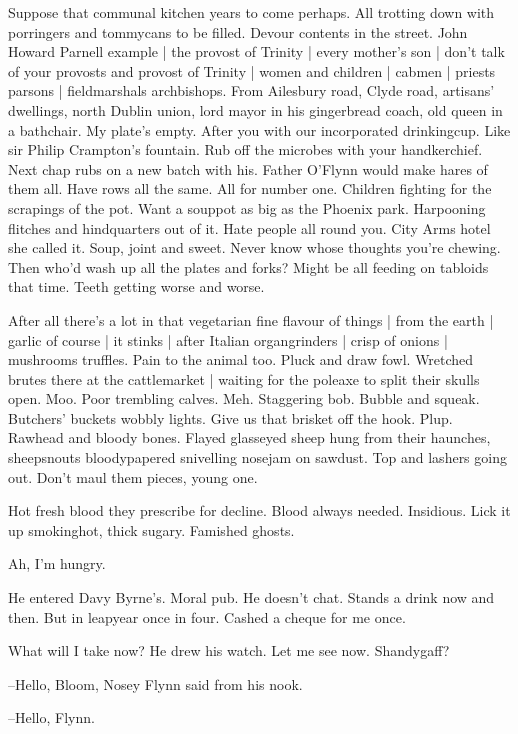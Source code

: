 Suppose that communal kitchen years to come perhaps.
All trotting down with porringers and tommycans to be filled.
Devour contents in the street.
John Howard Parnell example |
the provost of Trinity |
every mother's
son |
don't talk of your provosts and provost of Trinity |
women and children |
cabmen |
priests parsons |
fieldmarshals archbishops.
From Ailesbury road,
Clyde road,
artisans' dwellings,
north Dublin union,
lord mayor in his gingerbread coach,
old queen in a bathchair.
My plate's empty.
After you with our incorporated drinkingcup.
Like sir Philip Crampton's fountain.
Rub off the microbes with your handkerchief.
Next chap rubs on a new batch with his.
Father O'Flynn would make hares of them all.
Have rows all the same.
All for number one.
Children fighting for the scrapings of the pot.
Want a souppot as big as the Phoenix park.
Harpooning flitches and hindquarters out of it.
Hate people all round you.
City Arms hotel
she called it.
Soup, joint and sweet.
Never know whose thoughts you're chewing.
Then who'd wash up all the plates and forks?
Might be all feeding on tabloids that time.
Teeth getting worse and worse.

After all there's a lot in that vegetarian fine flavour of things |
from the earth |
garlic of course |
it stinks |
after Italian organgrinders |
crisp of onions |
mushrooms truffles.
Pain to the animal too.
Pluck and draw fowl.
Wretched brutes there at the cattlemarket |
waiting for the poleaxe to split their skulls open.
Moo.
Poor trembling calves.
Meh.
Staggering bob.
Bubble and squeak.
Butchers' buckets wobbly lights.
Give us that brisket off the hook.
Plup.
Rawhead and bloody bones.
Flayed glasseyed sheep hung from their haunches,
sheepsnouts bloodypapered snivelling nosejam on sawdust.
Top and lashers going out.
Don't maul them pieces, young one.

Hot fresh blood they prescribe for decline.
Blood always needed.
Insidious.
Lick it up smokinghot, thick sugary.
Famished ghosts.

Ah, I'm hungry.

He entered Davy Byrne's.
Moral pub.
He doesn't chat.
Stands a drink now and then.
But in leapyear once in four.
Cashed a cheque for me once.

What will I take now?
He drew his watch.
Let me see now.
Shandygaff?

--Hello,
Bloom,
Nosey Flynn said from his nook.

--Hello,
Flynn.

